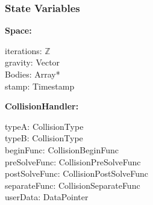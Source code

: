 \documentclass[12pt]{article}
\newcommand{\B}{$\mathbb{B}$}
\newcommand{\R}{$\mathbb{R}$}
\newcommand{\Z}{$\mathbb{Z}$}
\newcommand{\UZ}{$\mathbb{Z}^+$}
\begin{document}
\subsubsection{State Variables} \label{SecSVSpace}
	\textbf{Space:} 
	\begin{multicols}{2}
		\noindent iterations: \Z \\
		gravity: Vector \\
		Bodies: Array* \\
		stamp: Timestamp \\
	\end{multicols}
	
	\noindent \textbf{CollisionHandler:}
	\begin{multicols}{3}
		\noindent typeA: CollisionType \\
		typeB: CollisionType \\
		beginFunc: CollisionBeginFunc \\
		preSolveFunc: CollisionPreSolveFunc \\
		postSolveFunc: CollisionPostSolveFunc \\
		separateFunc: CollisionSeparateFunc \\
		userData: DataPointer
	\end{multicols}
	
\end{document}
